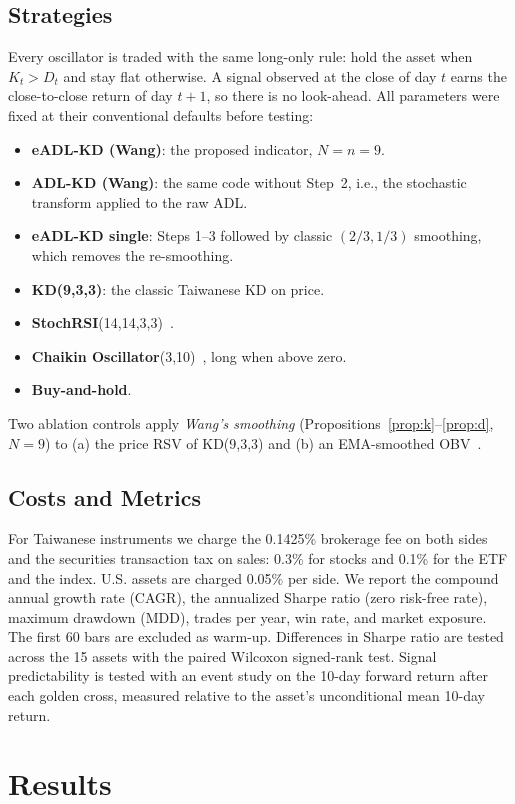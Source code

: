\documentclass[conference]{IEEEtran}
\begin{document}
\subsection{Strategies}
Every oscillator is traded with the same long-only rule: hold the asset when $K_t>D_t$ and stay flat otherwise. A signal observed at the close of day $t$ earns the close-to-close return of day $t+1$, so there is no look-ahead. All parameters were fixed at their conventional defaults before testing:
\begin{itemize}
\item \textbf{eADL-KD (Wang)}: the proposed indicator, $N=n=9$.
\item \textbf{ADL-KD (Wang)}: the same code without Step~2, i.e., the stochastic transform applied to the raw ADL.
\item \textbf{eADL-KD single}: Steps 1--3 followed by classic $(2/3,1/3)$ smoothing, which removes the re-smoothing.
\item \textbf{KD(9,3,3)}: the classic Taiwanese KD on price.
\item \textbf{StochRSI}(14,14,3,3)~\cite{chande1994}.
\item \textbf{Chaikin Oscillator}(3,10)~\cite{stockcharts_cho}, long when above zero.
\item \textbf{Buy-and-hold}.
\end{itemize}
Two ablation controls apply \emph{Wang's smoothing} (Propositions~\ref{prop:k}--\ref{prop:d}, $N=9$) to (a) the price RSV of KD(9,3,3) and (b) an EMA-smoothed OBV~\cite{granville1963}.

\subsection{Costs and Metrics}
For Taiwanese instruments we charge the 0.1425\% brokerage fee on both sides and the securities transaction tax on sales: 0.3\% for stocks and 0.1\% for the ETF and the index. U.S. assets are charged 0.05\% per side. We report the compound annual growth rate (CAGR), the annualized Sharpe ratio (zero risk-free rate), maximum drawdown (MDD), trades per year, win rate, and market exposure. The first 60 bars are excluded as warm-up. Differences in Sharpe ratio are tested across the 15 assets with the paired Wilcoxon signed-rank test. Signal predictability is tested with an event study on the 10-day forward return after each golden cross, measured relative to the asset's unconditional mean 10-day return.

\section{Results}\label{sec:results}
\end{document}
